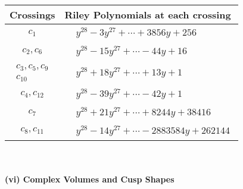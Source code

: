 \documentclass[1p]{elsarticle_modified}
\theoremstyle{definition}
\begin{document}
\begin{tabular}{m{50pt}|m{274pt}}
Crossings & \hspace{64pt}Riley Polynomials at each crossing \\
\hline $$\begin{aligned}c_{1}\end{aligned}$$&$\begin{aligned}
&y^{28}-3 y^{27}+\cdots+3856 y+256
\end{aligned}$\\
\hline $$\begin{aligned}c_{2},c_{6}\end{aligned}$$&$\begin{aligned}
&y^{28}-15 y^{27}+\cdots-44 y+16
\end{aligned}$\\
\hline $$\begin{aligned}c_{3},c_{5},c_{9}\\c_{10}\end{aligned}$$&$\begin{aligned}
&y^{28}+18 y^{27}+\cdots+13 y+1
\end{aligned}$\\
\hline $$\begin{aligned}c_{4},c_{12}\end{aligned}$$&$\begin{aligned}
&y^{28}-39 y^{27}+\cdots-42 y+1
\end{aligned}$\\
\hline $$\begin{aligned}c_{7}\end{aligned}$$&$\begin{aligned}
&y^{28}+21 y^{27}+\cdots+8244 y+38416
\end{aligned}$\\
\hline $$\begin{aligned}c_{8},c_{11}\end{aligned}$$&$\begin{aligned}
&y^{28}-14 y^{27}+\cdots-2883584 y+262144
\end{aligned}$\\
\hline
\end{tabular}\\~\\
\newpage\flushleft \textbf{(vi) Complex Volumes and Cusp Shapes}
\end{document}
